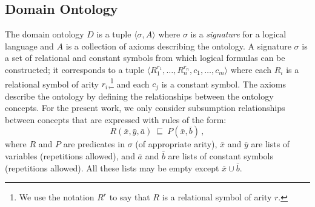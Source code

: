 \documentclass{llncs}
\newcommand{\tup}[1]{\langle #1 \rangle}
\newcommand{\orule}{\sqsubseteq}
\begin{document}
\subsection{Domain Ontology}

The domain ontology $D$ is a tuple $\tup{\sigma,A}$ where $\sigma$
is a \emph{signature} for a logical language and $A$ is a collection
of axioms describing the ontology.
A signature $\sigma$ is a set of relational and constant symbols from
which logical formulas can be constructed; it corresponds to a tuple
$\tup{R_1^{r_1},\ldots,R_n^{r_n},c_1,\ldots,c_m}$ where each $R_i$
is a relational symbol of arity $r_i$,\footnote{We use the notation
$R^r$ to say that $R$ is a relational symbol of arity $r$.} and each
$c_j$ is a constant symbol.
The axioms describe the ontology by defining the relationships between
the ontology concepts.
For the present work, we only consider subsumption relationships
between concepts that are expressed with rules of the form:
\begin{equation}
\label{eq:orule}
R(\bar x,\bar y, \bar a)\ \orule\ P(\bar x, \bar b)\,,
\end{equation}
where $R$ and $P$ are predicates in $\sigma$ (of appropriate arity),
$\bar x$ and $\bar y$ are lists of variables (repetitions allowed),
and $\bar a$ and $\bar b$ are lists of constant symbols (repetitions allowed).
All these lists may be empty except $\bar x\cup \bar b$.
\end{document}
